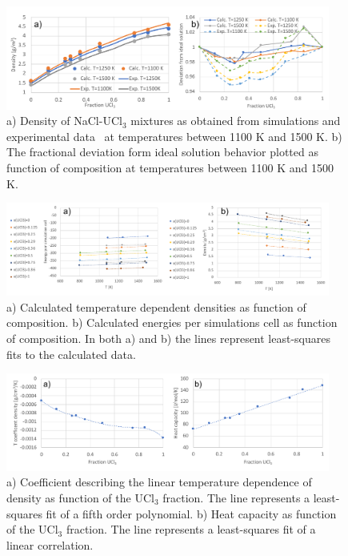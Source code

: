 \documentclass[preprint,3p,10pt,onecolumn,number,sort&compress]{elsarticle}
\begin{document}
\begin{figure}[htb]
\centering
\includegraphics[width=0.95\textwidth]{FIG6.pdf}
\caption{a) Density of NaCl-UCl$_3$ mixtures as obtained from simulations and experimental data~\cite{Desyatnik} at temperatures between 1100 K and 1500 K. %
b) The fractional deviation form ideal solution behavior plotted as function of composition at temperatures between 1100 K and 1500 K. %
} 
\label{fig:NaClUCl3}
\end{figure}

\begin{figure}[htb]
\centering
\includegraphics[width=0.95\textwidth]{FIG6c.pdf}
\caption{a) Calculated temperature dependent densities as function of composition. b) Calculated energies per simulations cell as function of composition. In both a) and b) the lines represent least-squares fits to the calculated data.}  
\label{fig:NaClUCl3_t}
\end{figure}

\begin{figure}[htb]
\centering
\includegraphics[width=0.95\textwidth]{FIG6f.pdf}
\caption{a) Coefficient describing the linear temperature dependence of density as function of the UCl$_3$ fraction. The line represents a least-squares fit of a fifth order polynomial. b) Heat capacity as function of the UCl$_3$ fraction. The line represents a least-squares fit of a linear correlation.}
\label{fig:NaClUCl3_comp}
\end{figure}
\end{document}
